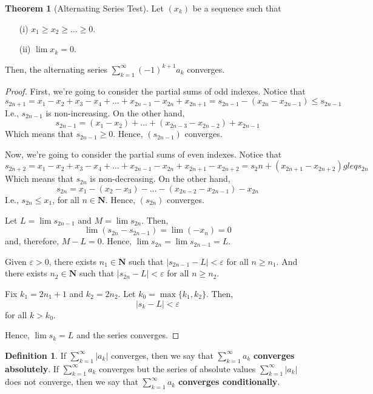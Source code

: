 \documentclass[tikz,12pt,a4paper]{article}
\theoremstyle{definition}
\newtheorem{theorem}{Theorem}[section]
\newtheorem{definition}{Definition}[section]
\begin{document}
\begin{theorem}[Alternating Series Test]
	Let $(x_k)$ be a sequence such that
	\begin{enumerate}
		\item[(i)] $x_1 \geq x_2 \geq \ldots \geq 0$.
		\item[(ii)] $\lim x_k = 0$.
	\end{enumerate}
	Then, the alternating series $\sum_{k=1}^\infty (-1)^{k+1} a_k$ converges.
\end{theorem}

\begin{proof}
	First, we're going to consider the partial sums of odd indexes. Notice that
	\[
		s_{2n+1} = x_1 - x_2 + x_3 - x_4 + \ldots + x_{2n-1} - x_{2n} + x_{2n+1} = s_{2n-1} - (x_{2n} - x_{2n-1}) \leq s_{2n-1}
	\]
	I.e., $s_{2n-1}$ is non-increasing. On the other hand,
	\[
		s_{2n-1} = (x_1 - x_2) + \ldots + (x_{2n-3} - x_{2n-2}) + x_{2n-1}
	\]
	Which means that $s_{2n-1} \geq 0$. Hence, $(s_{2n-1})$ converges.
	
	Now, we're going to consider the partial sums of even indexes. Notice that
	\[
		s_{2n+2} = x_1 - x_2 + x_3 - x_4 + \ldots + x_{2n-1} - x_{2n} + x_{2n+1} - x_{2n+2} = s_2n + (x_{2n+1} - x_{2n+2}) gleq s_{2n}
	\]
	Which means that $s_{2n}$ is non-decreasing. On the other hand,
	\[
		s_{2n} = x_1 - (x_2 - x_3) - \ldots - (x_{2n-2} - x_{2n-1}) - x_{2n}
	\]
	I.e., $s_{2n} \leq x_1$, for all $n \in \textbf{N}$. Hence, $(s_{2n})$ converges.
	
	Let $L = \lim s_{2n-1}$ and $M = \lim s_{2n}$. Then,
	\[
		\lim (s_{2n} - s_{2n-1}) = \lim (-x_n) = 0
	\]
	and, therefore, $M - L = 0$. Hence, $\lim s_{2n} = \lim s_{2n-1} = L$.
	
	Given $\varepsilon > 0$, there exists $n_1 \in \textbf{N}$ such that $|s_{2n-1} - L| < \varepsilon$ for all $n \geq n_1$. And there exists $n_2 \in \textbf{N}$ such that $|s_{2n} - L| < \varepsilon$ for all $n \geq n_2$.
	
	Fix $k_1 = 2n_1 +1$ and $k_2 = 2n_2$. Let $k_0 = \max \{ k_1, k_2 \}$. Then,
	\[
		|s_k - L| < \varepsilon
	\]
	for all $k > k_0$.
	
	Hence, $\lim s_k = L$ and the series converges.
\end{proof}

\begin{definition}
	If $\sum_{k=1}^\infty |a_k|$ converges, then we say that $\sum_{k=1}^\infty a_k$ \textbf{converges absolutely}. If $\sum_{k=1}^\infty a_k$ converges but the series of absolute values $\sum_{k=1}^\infty |a_k|$ does not converge, then we say that $\sum_{k=1}^\infty a_k$ \textbf{converges conditionally}.
\end{definition}
\end{document}

